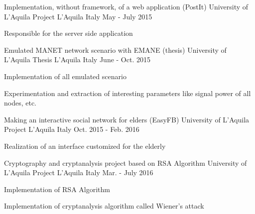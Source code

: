 


\begin{cventries}


\cventry
{Implementation, without framework, of a web application (PostIt)} %
{University of L'Aquila Project} %
{L'Aquila Italy} %
{May - July 2015} %
{ %
	\begin{cvitems}
		\item {Responsible for the server side application}
	\end{cvitems}
}

\cventry
{Emulated MANET network scenario with EMANE (thesis) } %
{University of L'Aquila Thesis} %
{L'Aquila Italy} %
{June - Oct. 2015} %
{ %
	\begin{cvitems}
		\item {Implementation of all emulated scenario}
		\item {Experimentation and extraction of interesting parameters like signal power of all nodes, etc.}
	\end{cvitems}
}

\cventry
{Making an interactive social network for elders (EasyFB)} %
{University of L'Aquila Project} %
{L'Aquila Italy} %
{Oct. 2015 - Feb. 2016} %
{ %
	\begin{cvitems}
		\item {Realization of an interface customized for the elderly}
	\end{cvitems}
}

\cventry
{Cryptography and cryptanalysis project based on RSA Algorithm} %
{University of L'Aquila Project} %
{L'Aquila Italy} %
{Mar. - July 2016} %
{
	\begin{cvitems}
		\item {Implementation of RSA Algorithm}
		\item {Implementation of cryptanalysis algorithm called Wiener's attack}
	\end{cvitems}
}


\end{cventries}
